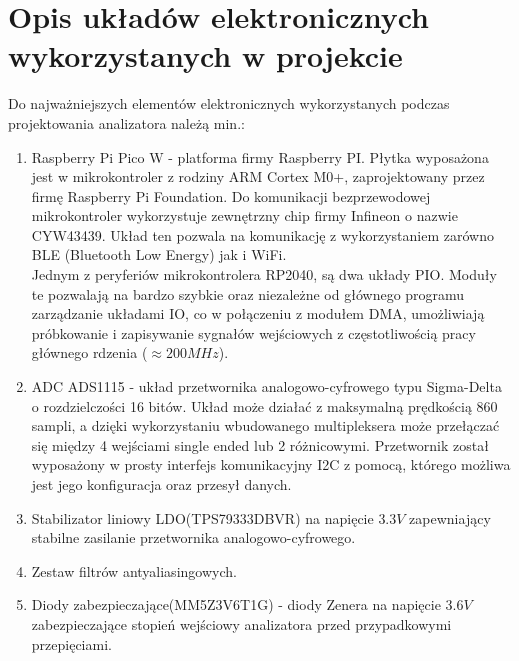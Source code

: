 \section{Opis układów elektronicznych wykorzystanych w projekcie}

Do najważniejszych elementów elektronicznych wykorzystanych 
podczas projektowania analizatora należą min.:
 
\begin{enumerate}
    \item Raspberry Pi Pico W - platforma firmy Raspberry PI.
        Płytka wyposażona jest w mikrokontroler z rodziny ARM Cortex M0+, zaprojektowany przez firmę Raspberry Pi Foundation.
        Do komunikacji bezprzewodowej mikrokontroler wykorzystuje zewnętrzny chip firmy Infineon o nazwie CYW43439.
        Układ ten pozwala na komunikację z wykorzystaniem zarówno BLE (Bluetooth Low Energy) jak i WiFi.\\
        Jednym z peryferiów mikrokontrolera RP2040, są dwa układy PIO.
        Moduły te pozwalają na bardzo szybkie oraz niezależne od głównego programu zarządzanie układami IO,
        co w połączeniu z modułem DMA, umożliwiają próbkowanie i zapisywanie sygnałów wejściowych z częstotliwością pracy głównego rdzenia ($\approx 200MHz$).
    \item ADC ADS1115 - 
        układ przetwornika analogowo-cyfrowego typu Sigma-Delta o rozdzielczości 16 bitów.
        Układ może działać z maksymalną prędkością 860 sampli,
        a dzięki wykorzystaniu wbudowanego multipleksera może przełączać się między 4 wejściami single ended lub 2 różnicowymi.
        Przetwornik został wyposażony w prosty interfejs komunikacyjny I2C z pomocą, którego możliwa jest jego konfiguracja oraz przesył danych.
    \item Stabilizator liniowy LDO(TPS79333DBVR) na napięcie $3.3 V$ zapewniający stabilne
    zasilanie przetwornika analogowo-cyfrowego.
    \item Zestaw filtrów antyaliasingowych.
    \item Diody zabezpieczające(MM5Z3V6T1G) - diody Zenera na napięcie $3.6V$ zabezpieczające stopień wejściowy analizatora
    przed przypadkowymi przepięciami.
\end{enumerate}
